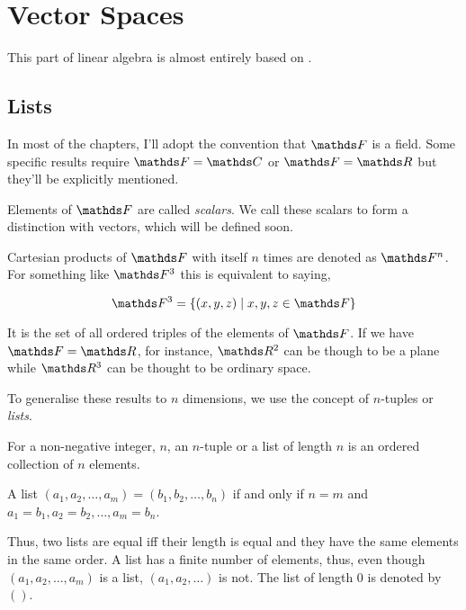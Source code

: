 \chapter{Vector Spaces}

This part of linear algebra is almost entirely based on \cite{axlerlin}.

\section{Lists}

In most of the chapters, I'll adopt the convention that \(\FF\) is a field. Some specific results require \(\FF = \CC\) or \(\FF = \RR\)
but they'll be explicitly mentioned.


Elements of \(\FF\) are called \emph{scalars}. We call these scalars to form a distinction with vectors, which will be defined soon.

Cartesian products of \(\FF\) with itself \(n\) times are denoted as \(\FF^{n}\). For something like
\(\FF^3\) this is equivalent to saying,

\[
    \FF^{3} = \left\{(x, y, z) \mid x, y, z \in \FF\right\}
\]

It is the set of all ordered triples of the elements of \(\FF\). If we have \(\FF = \RR\),
for instance, \(\RR^2\) can be though to be a plane while \(\RR^3\) can be thought to be ordinary space.

To generalise these results to \(n\) dimensions, we use the concept of \(n\)-tuples or \emph{lists}.

 


\begin{definition}[Lists]
    For a non-negative integer, \(n\), an \(n\)-tuple or a list of length \(n\) is an ordered collection of \(n\) elements.
    
    A list \((a_1, a_2, \dots, a_m) = (b_1, b_2, \dots, b_n)\) if and only if \(n = m\) and \(a_1 = b_1, a_2 = b_2, \dots,
    a_m = b_n\).
\end{definition}

Thus, two lists are equal iff their length is equal and they have the same elements in the same order.
A list has a finite number of elements, thus, even though \((a_1, a_2, \dots, a_m)\) is a list, \((a_1, a_2, \dots)\) is not.
The list of length \(0\) is denoted by \(()\). 

